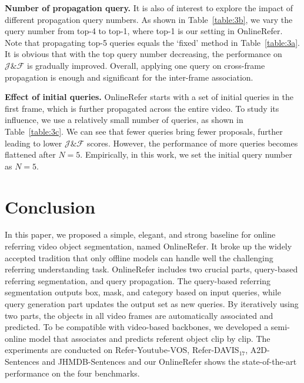 \documentclass[10pt,twocolumn,letterpaper]{article}
\begin{document}
\noindent\textbf{Number of propagation query.}
It is also of interest to explore the impact of different propagation query numbers.
As shown in Table~\ref{table:3b}, we vary the query number from top-4 to top-1, where top-1 is our setting in OnlineRefer.
Note that propagating top-5 queries equals the `fixed' method in Table~\ref{table:3a}.
It is obvious that with the top query number decreasing, the performance on $\mathcal{J} \& \mathcal{F}$ is gradually improved.
Overall, applying one query on cross-frame propagation is enough and significant  for the inter-frame association.

\noindent\textbf{Effect of initial queries.}
OnlineRefer starts with a set of initial queries in the first frame, which is further propagated across the entire video.
To study its influence, we use a relatively small number of queries, as shown in Table~\ref{table:3c}.
We can see that fewer queries bring fewer proposals, further leading to lower $\mathcal{J} \& \mathcal{F}$ scores.
However, the performance of more queries becomes flattened after $N\!=\!5$.
Empirically, in this work, we set the initial query number as $N\!=\!5$.








\section{Conclusion}



In this paper, we proposed a simple, elegant, and strong baseline for online referring video object segmentation, named OnlineRefer.
It broke up the widely accepted tradition that only offline models can handle well the challenging referring understanding task.
OnlineRefer includes two crucial parts, query-based referring segmentation, and query propagation.
The query-based referring segmentation outputs box, mask, and category based on input queries, while query generation part updates the output set as new queries.
By iteratively using two parts, the objects in all video frames are automatically associated and predicted.
To be compatible with video-based backbones, we developed a semi-online model that associates and predicts referent object clip by clip.
The experiments are conducted on Refer-Youtube-VOS, Refer-DAVIS$_{17}$, A2D-Sentences and JHMDB-Sentences and our OnlineRefer  shows the state-of-the-art performance on the four benchmarks.


{\small


}
\end{document}
